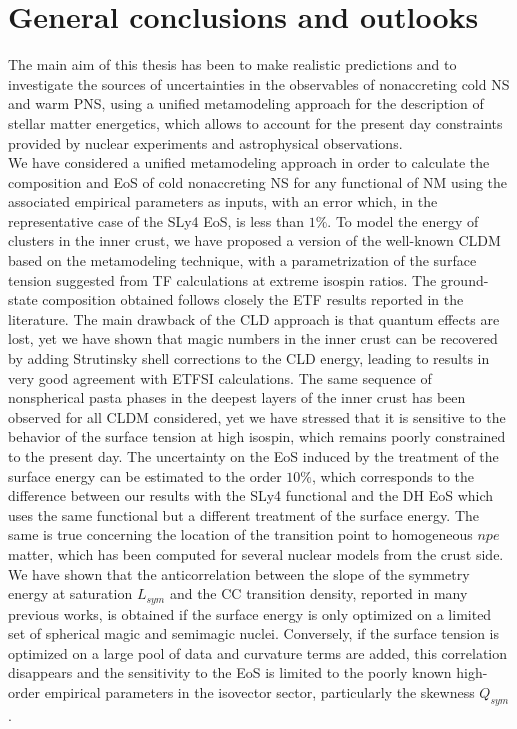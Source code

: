 \chapter*{General conclusions and outlooks}

The main aim of this thesis has been to make realistic predictions and to 
investigate the sources of uncertainties in the observables of nonaccreting 
cold NS and warm PNS, using a unified metamodeling 
approach for the description of stellar matter energetics, which allows to 
account for the present day constraints provided by nuclear experiments and 
astrophysical observations.
\\

We have considered a unified metamodeling approach in order to 
calculate the composition and EoS of cold nonaccreting NS for any 
functional of NM using the associated empirical parameters as inputs, with an 
error which, in the representative case of the SLy4 EoS, is less than $1\%$. 
To model the energy of clusters in the inner crust, we have proposed a version 
of the well-known CLDM based on the metamodeling technique, with a
parametrization of the surface tension suggested from TF calculations at 
extreme isospin ratios. The ground-state composition obtained follows closely 
the ETF results reported in the literature. The main drawback of the 
CLD approach is that quantum effects are lost, yet we have shown that magic 
numbers in the inner crust can be recovered by adding Strutinsky shell 
corrections to the CLD energy, leading to results in very good agreement with 
ETFSI calculations. 
The same sequence of nonspherical pasta phases in the deepest layers of the 
inner crust has been observed for all CLDM considered, yet we have stressed 
that it is sensitive to the behavior of the surface tension at high isospin,
which remains poorly constrained to the present day. 
The uncertainty on the EoS induced by the treatment of the surface energy can
be estimated to the order $10\%$, which corresponds to the difference between
our results with the SLy4 functional and the DH EoS which uses the same
functional but a different treatment of the surface energy. 
The same is true concerning the location of the transition point to 
homogeneous $npe$ matter, which has been computed for several nuclear models
from the crust side. 
We have shown that the anticorrelation between the slope of the symmetry energy
at saturation $L_{sym}$ and the CC transition density, reported in many
previous works, is obtained if the surface energy is only optimized on a
limited set of spherical magic and semimagic nuclei. Conversely, if the surface
tension is optimized on a large pool of data and curvature terms are added,
this correlation disappears and the sensitivity to the EoS is limited to the
poorly known high-order empirical parameters in the isovector sector, 
particularly the skewness $Q_{sym}$.

